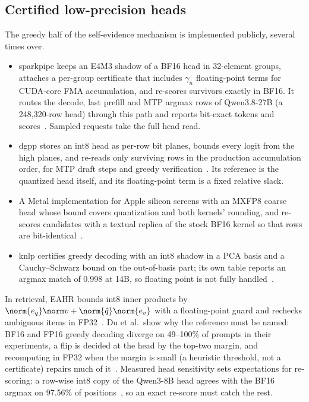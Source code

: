 \subsection{Certified low-precision heads}\label{sec:prior-certified}
The greedy half of the self-evidence mechanism is implemented publicly, several times over.
\begin{itemize}
\item sparkpipe keeps an E4M3 shadow of a BF16 head in 32-element groups, attaches a per-group certificate that includes $\gamma_n$ floating-point terms for CUDA-core FMA accumulation, and re-scores survivors exactly in BF16. It routes the decode, last prefill and MTP argmax rows of Qwen3.8-27B (a 248,320-row head) through this path and reports bit-exact tokens and scores~\cite{sparkpipehead}. Sampled requests take the full head read.
\item dgpp stores an int8 head as per-row bit planes, bounds every logit from the high planes, and re-reads only surviving rows in the production accumulation order, for MTP draft steps and greedy verification~\cite{dgpphead}. Its reference is the quantized head itself, and its floating-point term is a fixed relative slack.
\item A Metal implementation for Apple silicon screens with an MXFP8 coarse head whose bound covers quantization and both kernels' rounding, and re-scores candidates with a textual replica of the stock BF16 kernel so that rows are bit-identical~\cite{lagunaprune}.
\item knlp certifies greedy decoding with an int8 shadow in a PCA basis and a Cauchy--Schwarz bound on the out-of-basis part; its own table reports an argmax match of 0.998 at 14B, so floating point is not fully handled~\cite{knlphead}.
\end{itemize}
In retrieval, EAHR bounds int8 inner products by $\norm{e_q}\norm v+\norm{\hat q}\norm{e_v}$ with a floating-point guard and rechecks ambiguous items in FP32~\cite{eahr}. Du et al.\ show why the reference must be named: BF16 and FP16 greedy decoding diverge on 49--100\% of prompts in their experiments, a flip is decided at the head by the top-two margin, and recomputing in FP32 when the margin is small (a heuristic threshold, not a certificate) repairs much of it~\cite{precisioninvariant}. Measured head sensitivity sets expectations for re-scoring: a row-wise int8 copy of the Qwen3-8B head agrees with the BF16 argmax on 97.56\% of positions~\cite{archead}, so an exact re-score must catch the rest.

